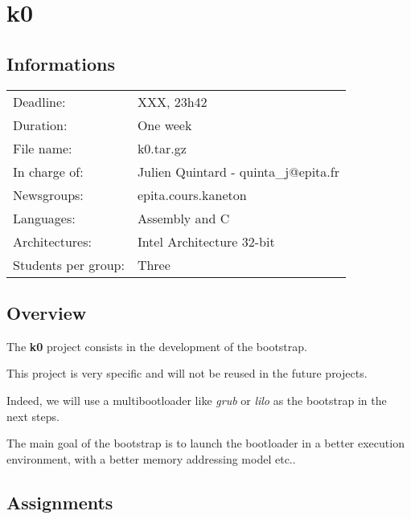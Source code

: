 
%
%

\section{k0}

%
%

\subsection{Informations}

\begin{tabular}{p{7cm}l}
Deadline: & XXX, 23h42 \\
Duration: & One week \\
File name: & k0.tar.gz \\
In charge of: & Julien Quintard - \small{quinta\_j@epita.fr} \\
Newsgroups: & epita.cours.kaneton \\
Languages: & Assembly and C \\
Architectures: & Intel Architecture 32-bit \\
Students per group: & Three \\
\end{tabular}

%
%

\subsection{Overview}

The \textbf{k0} project consists in the development of the bootstrap.

This project is very specific and will not be reused in the future
projects.

Indeed, we will use a multibootloader like \textit{grub} or \textit{lilo}
as the bootstrap in the next steps.

The main goal of the bootstrap is to launch the bootloader in a better
execution environment, with a better memory addressing model etc..

%
%

\subsection{Assignments}

